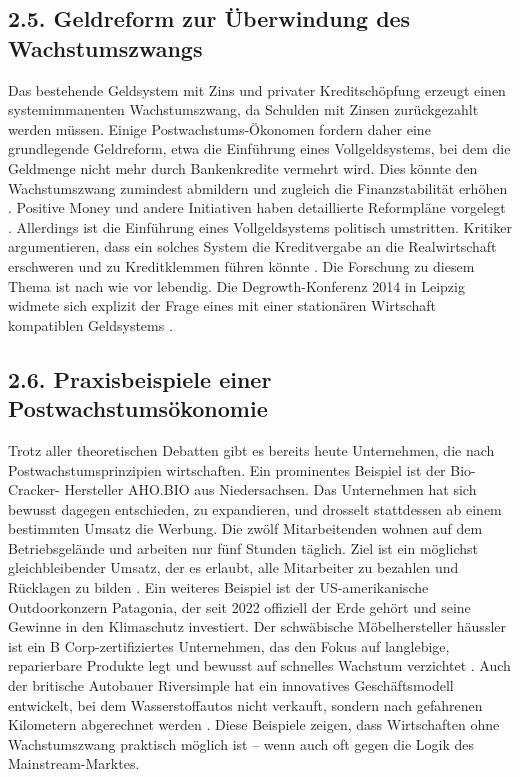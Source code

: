\documentclass[12pt, a4paper]{article}
\begin{document}
	\subsection*{2.5. Geldreform zur Überwindung des Wachstumszwangs}
	Das bestehende Geldsystem mit Zins und privater Kreditschöpfung erzeugt einen
	systemimmanenten Wachstumszwang, da Schulden mit Zinsen zurückgezahlt werden müssen.
	Einige Postwachstums-Ökonomen fordern daher eine grundlegende Geldreform, etwa die
	Einführung eines Vollgeldsystems, bei dem die Geldmenge nicht mehr durch
	Bankenkredite vermehrt wird. Dies könnte den Wachstumszwang zumindest abmildern und
	zugleich die Finanzstabilität erhöhen \cite{vollgeld2026}. Positive Money und andere
	Initiativen haben detaillierte Reformpläne vorgelegt \cite{worldfuturecouncil}.
	Allerdings ist die Einführung eines Vollgeldsystems politisch umstritten. Kritiker
	argumentieren, dass ein solches System die Kreditvergabe an die Realwirtschaft
	erschweren und zu Kreditklemmen führen könnte \cite{nzz2014}. Die Forschung zu diesem
	Thema ist nach wie vor lebendig. Die Degrowth-Konferenz 2014 in Leipzig widmete sich
	explizit der Frage eines mit einer stationären Wirtschaft kompatiblen Geldsystems
	\cite{degrowth2014}.
	
	\subsection*{2.6. Praxisbeispiele einer Postwachstumsökonomie}
	Trotz aller theoretischen Debatten gibt es bereits heute Unternehmen, die nach
	Postwachstumsprinzipien wirtschaften. Ein prominentes Beispiel ist der Bio-Cracker-
	Hersteller AHO.BIO aus Niedersachsen. Das Unternehmen hat sich bewusst dagegen
	entschieden, zu expandieren, und drosselt stattdessen ab einem bestimmten Umsatz die
	Werbung. Die zwölf Mitarbeitenden wohnen auf dem Betriebsgelände und arbeiten nur
	fünf Stunden täglich. Ziel ist ein möglichst gleichbleibender Umsatz, der es erlaubt,
	alle Mitarbeiter zu bezahlen und Rücklagen zu bilden \cite{goethe2026}. Ein weiteres
	Beispiel ist der US-amerikanische Outdoorkonzern Patagonia, der seit 2022 offiziell
	der Erde gehört und seine Gewinne in den Klimaschutz investiert. Der schwäbische
	Möbelhersteller häussler ist ein B Corp-zertifiziertes Unternehmen, das den Fokus
	auf langlebige, reparierbare Produkte legt und bewusst auf schnelles Wachstum
	verzichtet \cite{goethe2026}. Auch der britische Autobauer Riversimple hat ein
	innovatives Geschäftsmodell entwickelt, bei dem Wasserstoffautos nicht verkauft,
	sondern nach gefahrenen Kilometern abgerechnet werden \cite{sciencedirect2016}. Diese
	Beispiele zeigen, dass Wirtschaften ohne Wachstumszwang praktisch möglich ist – wenn
	auch oft gegen die Logik des Mainstream-Marktes.
	
\end{document}
